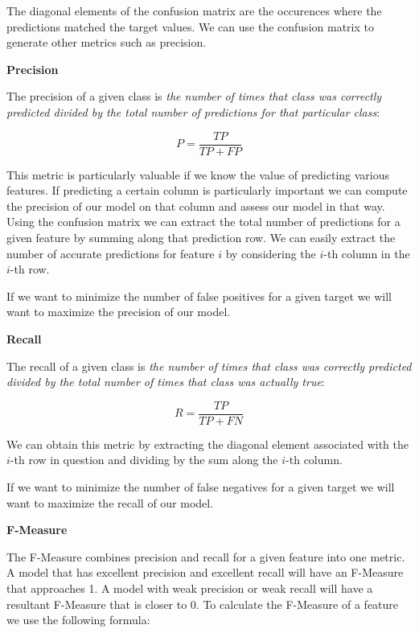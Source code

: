 \documentclass{article}
\begin{document}
\noindent The diagonal elements of the confusion matrix are the occurences where the predictions matched the target values. We can use the confusion matrix to generate other metrics such as precision.


\vspace{3mm}
\noindent
\textbf{Precision}

\vspace{3mm}
\noindent
The precision of a given class is \textit{the number of times that class was correctly predicted divided by the total number of predictions for that particular class}:

\[P = \frac{TP}{TP + FP}\]

\noindent
This metric is particularly valuable if we know the value of predicting various features. If predicting a certain column is particularly important we can compute the precision of our model on that column and assess our model in that way. Using the confusion matrix we can extract the total number of predictions for a given feature by summing along that prediction row. We can easily extract the number of accurate predictions for feature $i$ by considering the $i$-th column in the $i$-th row. 

\vspace{3mm}
\noindent
If we want to minimize the number of false positives for a given target we will want to maximize the precision of our model. 


\vspace{3mm}
\noindent
\textbf{Recall}

\vspace{3mm}
\noindent
The recall of a given class is \textit{the number of times that class was correctly predicted divided by the total number of times that class was actually true}:

\[R = \frac{TP}{TP + FN}\]

\noindent
We can obtain this metric by extracting the diagonal element associated with the $i$-th row in question and dividing by the sum along the $i$-th column. 

\vspace{3mm}
\noindent
If we want to minimize the number of false negatives for a given target we will want to maximize the recall of our model. 


\vspace{3mm}
\noindent
\textbf{F-Measure}


\vspace{3mm}
\noindent
The F-Measure combines precision and recall for a given feature into one metric. A model that has excellent precision and excellent recall will have an F-Measure that approaches 1. A model with weak precision or weak recall will have a resultant F-Measure that is closer to 0. To calculate the F-Measure of a feature we use the following formula:
\end{document}
